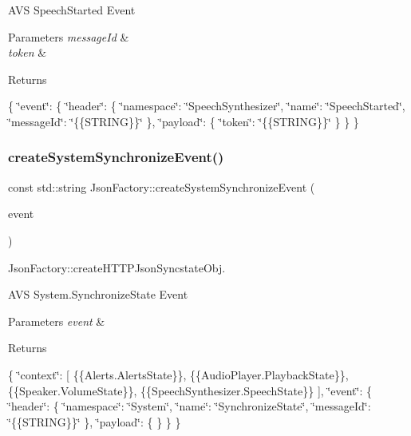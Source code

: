 A\+VS Speech\+Started Event 
\begin{DoxyParams}{Parameters}
{\em message\+Id} & \\
\hline
{\em token} & \\
\hline
\end{DoxyParams}
\begin{DoxyReturn}{Returns}

\end{DoxyReturn}
\{ \char`\"{}event\char`\"{}\+: \{ \char`\"{}header\char`\"{}\+: \{ \char`\"{}namespace\char`\"{}\+: \char`\"{}\+Speech\+Synthesizer\char`\"{}, \char`\"{}name\char`\"{}\+: \char`\"{}\+Speech\+Started\char`\"{}, \char`\"{}message\+Id\char`\"{}\+: \char`\"{}\{\{\+S\+T\+R\+I\+N\+G\}\}\char`\"{} \}, \char`\"{}payload\char`\"{}\+: \{ \char`\"{}token\char`\"{}\+: \char`\"{}\{\{\+S\+T\+R\+I\+N\+G\}\}\char`\"{} \} \} \} \mbox{\label{classAVSJson_1_1JsonFactory_a81f6e5126ee5a0fe06adfb7a2de3bde6}} 
\subsubsection{\texorpdfstring{create\+System\+Synchronize\+Event()}{createSystemSynchronizeEvent()}}
{\footnotesize\ttfamily const std\+::string Json\+Factory\+::create\+System\+Synchronize\+Event (\begin{DoxyParamCaption}\item[{const \hyperlink{structAVSJson_1_1SynchronizeStateEvent}{Synchronize\+State\+Event} $\ast$}]{event }\end{DoxyParamCaption})}



Json\+Factory\+::create\+H\+T\+T\+P\+Json\+Syncstate\+Obj. 

A\+VS System.\+Synchronize\+State Event 
\begin{DoxyParams}{Parameters}
{\em event} & \\
\hline
\end{DoxyParams}
\begin{DoxyReturn}{Returns}

\end{DoxyReturn}
\{ \char`\"{}context\char`\"{}\+: \mbox{[} \{\{Alerts.\+Alerts\+State\}\}, \{\{Audio\+Player.\+Playback\+State\}\}, \{\{Speaker.\+Volume\+State\}\}, \{\{Speech\+Synthesizer.\+Speech\+State\}\} \mbox{]}, \char`\"{}event\char`\"{}\+: \{ \char`\"{}header\char`\"{}\+: \{ \char`\"{}namespace\char`\"{}\+: \char`\"{}\+System\char`\"{}, \char`\"{}name\char`\"{}\+: \char`\"{}\+Synchronize\+State\char`\"{}, \char`\"{}message\+Id\char`\"{}\+: \char`\"{}\{\{\+S\+T\+R\+I\+N\+G\}\}\char`\"{} \}, \char`\"{}payload\char`\"{}\+: \{ \} \} \} 

